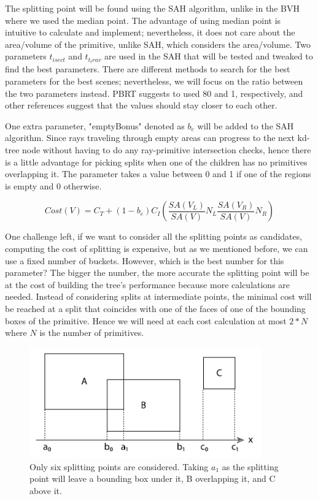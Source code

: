 \documentclass[11pt,a4paper]{article}
\begin{document}
The splitting point will be found using the SAH algorithm, unlike in the BVH where we used the median point. The advantage of using median point is intuitive to calculate and implement; nevertheless, it does not care about the area/volume of the primitive, unlike SAH, which considers the area/volume. Two parameters $t_{isect}$ and $t_{t_trav}$ are used in the SAH that will be tested and tweaked to find the best parameters. There are different methods to search for the best parameters for the best scenes; nevertheless, we will focus on the ratio between the two parameters instead. PBRT suggests to used 80 and 1, respectively, and other references suggest that the values should stay closer to each other. 
\\
\noindent

One extra parameter, "emptyBonus" denoted as $b_e$ will be added to the SAH algorithm. Since rays traveling through empty areas can progress to the next kd-tree node without having to do any ray-primitive intersection checks, hence there is a little advantage for picking splits when one of the children has no primitives overlapping it. The parameter takes a value between 0 and 1 if one of the regions is empty and 0 otherwise. 

\begin{equation}
Cost(V) = C_T + (1-b_e)C_I(\frac{SA(V_L)}{SA(V)}N_L \frac{SA(V_R)}{SA(V)}N_R)
\end{equation}

One challenge left, if we want to consider all the splitting points as candidates, computing the cost of splitting is expensive, but as we mentioned before, we can use a fixed number of buckets. However, which is the best number for this parameter? The bigger the number, the more accurate the splitting point will be at the cost of building the tree's performance because more calculations are needed. Instead of considering splits at intermediate points, the minimal cost will be reached at a split that coincides with one of the faces of one of the bounding boxes of the primitive. Hence we will need at each cost calculation at most $2 * N$ where $N$ is the number of primitives.

\begin{figure}[H]	
     \centering
     \captionsetup{justification=centering,margin=2cm}
     \includegraphics[width=10cm]{images/kdtree/projected_bboxes.png}
     \caption{Only six splitting points are considered. Taking $a_1$ as the splitting point will leave a bounding box under it, B overlapping it, and C above it. \protect\cite{Pharr2016}}
        \label{fig:dice}
\end{figure}
\end{document}
